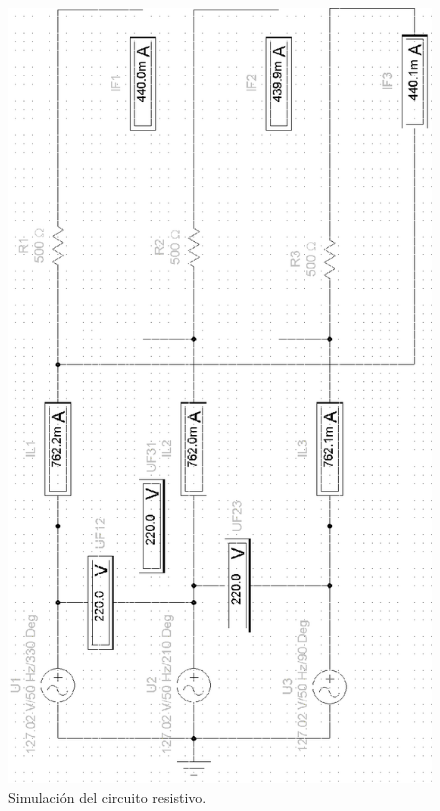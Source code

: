 \documentclass[letter,11pt]{article}
\begin{document}
\begin{figure}[!h]
\centering
\includegraphics[scale=1.08]{simulacion/practica2.1.eps}
\caption{Simulación del circuito resistivo.}
\label{simulacion1}
\end{figure}
\end{document}
